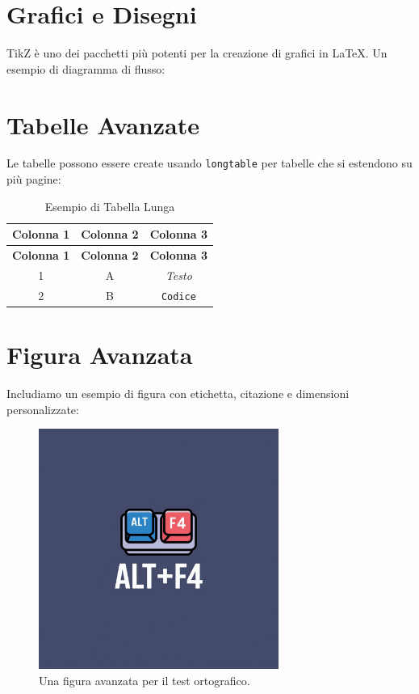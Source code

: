 \documentclass[12pt]{article}
\begin{document}
\section{Grafici e Disegni}
TikZ è uno dei pacchetti più potenti per la creazione di grafici in LaTeX. Un esempio di diagramma di flusso:


\section{Tabelle Avanzate}
Le tabelle possono essere create usando \texttt{longtable} per tabelle che si estendono su più pagine:

\begin{longtable}{|c|c|c|}
\caption{Esempio di Tabella Lunga} \\
\hline
\textbf{Colonna 1} & \textbf{Colonna 2} & \textbf{Colonna 3} \\
\hline
\endfirsthead
\hline
\textbf{Colonna 1} & \textbf{Colonna 2} & \textbf{Colonna 3} \\
\hline
\endhead
1 & A & \textit{Testo} \\
2 & B & \texttt{Codice} \\
\end{longtable}

\section{Figura Avanzata}
Includiamo un esempio di figura con etichetta, citazione e dimensioni personalizzate:

\begin{figure}[H]
    \centering
    \includegraphics[width=0.7\textwidth]{Immagini/logo.jpeg}
    \caption{Una figura avanzata per il test ortografico.}
    \label{fig:example}
\end{figure}
\end{document}
